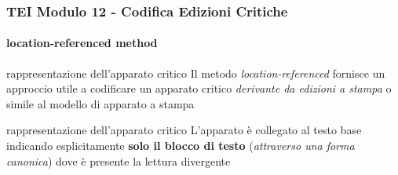 \begin{frame}
    \frametitle{TEI Modulo 12 - Codifica Edizioni Critiche}
    \framesubtitle{location-referenced method}
    \addtocounter{nframe}{1}
    




    \begin{block}{rappresentazione dell'apparato critico}
        Il metodo \textit{location-referenced} fornisce un approccio utile a codificare un apparato critico \textit{derivante da edizioni a stampa} o simile al modello di apparato a stampa
    \end{block}
    \begin{block}{rappresentazione dell'apparato critico}
         L'apparato è collegato al testo base indicando esplicitamente \textbf{solo il blocco di testo} (\textit{attraverso una forma canonica}) dove è presente la lettura divergente
     \end{block}

\end{frame}



